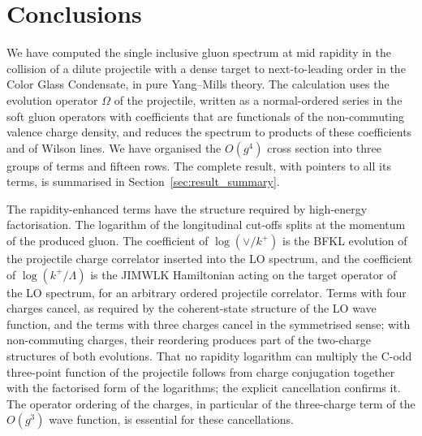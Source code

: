 \section{Conclusions}\label{sec:conclusions}

We have computed the single inclusive gluon spectrum at mid rapidity in the collision of a dilute projectile with a dense target to next-to-leading order in the Color Glass Condensate, in pure Yang--Mills theory. The calculation uses the evolution operator $\Omega$ of the projectile, written as a normal-ordered series in the soft gluon operators with coefficients that are functionals of the non-commuting valence charge density, and reduces the spectrum to products of these coefficients and of Wilson lines. We have organised the $O(g^4)$ cross section into three groups of terms and fifteen rows. The complete result, with pointers to all its terms, is summarised in Section~\ref{sec:result_summary}.

The rapidity-enhanced terms have the structure required by high-energy factorisation. The logarithm of the longitudinal cut-offs splits at the momentum of the produced gluon. The coefficient of $\log(\vee/k^+)$ is the BFKL evolution of the projectile charge correlator inserted into the LO spectrum, and the coefficient of $\log(k^+/\Lambda)$ is the JIMWLK Hamiltonian acting on the target operator of the LO spectrum, for an arbitrary ordered projectile correlator. Terms with four charges cancel, as required by the coherent-state structure of the LO wave function, and the terms with three charges cancel in the symmetrised sense; with non-commuting charges, their reordering produces part of the two-charge structures of both evolutions. That no rapidity logarithm can multiply the C-odd three-point function of the projectile follows from charge conjugation together with the factorised form of the logarithms; the explicit cancellation confirms it. The operator ordering of the charges, in particular of the three-charge term of the $O(g^3)$ wave function, is essential for these cancellations.

